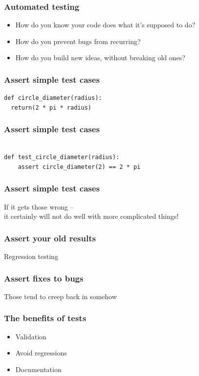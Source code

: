\documentclass{beamer}
\begin{document}
\begin{frame}
\frametitle{Automated testing}
\begin{itemize}
\pause
\item
How do you know your code does what it's supposed to do?
\pause
\item
How do you prevent bugs from recurring?
\item
\pause 
How do you build new ideas, without breaking old ones?
\end{itemize}
\end{frame}

\begin{frame}[fragile]
\frametitle{Assert simple test cases}
\begin{lstlisting}
def circle_diameter(radius):
  return(2 * pi * radius)
\end{lstlisting}
\end{frame}

\begin{frame}[fragile]
\frametitle{Assert simple test cases}
\begin{lstlisting}

def test_circle_diameter(radius):
    assert circle_diameter(2) == 2 * pi

\end{lstlisting}
\end{frame}

\begin{frame}[fragile]
\frametitle{Assert simple test cases}
If it gets those wrong -- 
\\ 
it certainly will not do well with more complicated things!
\end{frame}


\begin{frame}[fragile]
\frametitle{Assert your old results}

Regression testing

\end{frame}


\begin{frame}[fragile]
\frametitle{Assert fixes to bugs}

Those tend to creep back in somehow 

\end{frame}



\begin{frame}
\frametitle{The benefits of tests}
\begin{itemize}
\pause
\item
Validation
\pause
\item
Avoid regressions
\pause
\item
Documentation
\end{itemize}
\end{frame}
\end{document}
